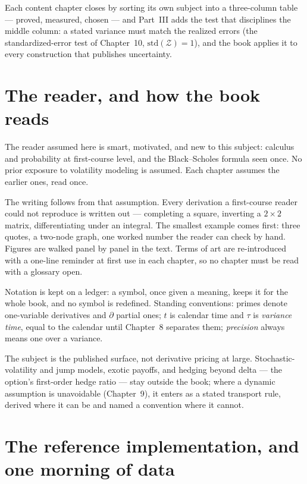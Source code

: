 Each content chapter closes by sorting its own subject into a
three-column table --- proved, measured, chosen --- and Part~III adds
the test that disciplines the middle column: a stated variance must
match the realized errors (the standardized-error test of
Chapter~10, $\mathrm{std}(\mathcal{Z})=1$), and the book applies it
to every construction that publishes uncertainty.

\section{The reader, and how the book reads}
\label{sec:introreader}

The reader assumed here is smart, motivated, and new to this subject:
calculus and probability at first-course level, and the
Black--Scholes formula seen once.  No prior exposure to volatility
modeling is assumed.  Each chapter assumes the earlier ones, read
once.

The writing follows from that assumption.  Every derivation a
first-course reader could not reproduce is written out --- completing
a square, inverting a $2\times2$ matrix, differentiating under an
integral.  The smallest example comes first: three quotes, a two-node
graph, one worked number the reader can check by hand.  Figures are
walked panel by panel in the text.  Terms of art are re-introduced
with a one-line reminder at first use in each chapter, so no chapter
must be read with a glossary open.

Notation is kept on a ledger: a symbol, once given a meaning, keeps
it for the whole book, and no symbol is redefined.  Standing
conventions: primes denote one-variable derivatives and $\partial$
partial ones; $t$ is calendar time and $\tau$ is \emph{variance
time}, equal to the calendar until Chapter~8 separates them;
\emph{precision} always means one over a variance.

The subject is the published surface, not derivative pricing at
large.  Stochastic-volatility and jump models, exotic payoffs, and
hedging beyond delta --- the option's first-order hedge ratio ---
stay outside the book; where a dynamic
assumption is unavoidable (Chapter~9), it enters as a stated
transport rule, derived where it can be and named a convention where
it cannot.

\section{The reference implementation, and one morning of data}
\label{sec:introimpl}

